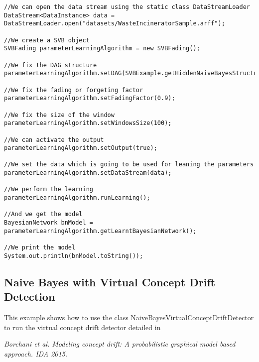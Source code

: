 \begin{lstlisting}
//We can open the data stream using the static class DataStreamLoader
DataStream<DataInstance> data = DataStreamLoader.open("datasets/WasteIncineratorSample.arff");

//We create a SVB object
SVBFading parameterLearningAlgorithm = new SVBFading();

//We fix the DAG structure
parameterLearningAlgorithm.setDAG(SVBExample.getHiddenNaiveBayesStructure(data));

//We fix the fading or forgeting factor
parameterLearningAlgorithm.setFadingFactor(0.9);

//We fix the size of the window
parameterLearningAlgorithm.setWindowsSize(100);

//We can activate the output
parameterLearningAlgorithm.setOutput(true);

//We set the data which is going to be used for leaning the parameters
parameterLearningAlgorithm.setDataStream(data);

//We perform the learning
parameterLearningAlgorithm.runLearning();

//And we get the model
BayesianNetwork bnModel = parameterLearningAlgorithm.getLearntBayesianNetwork();

//We print the model
System.out.println(bnModel.toString());
\end{lstlisting}


\subsection{Naive Bayes with Virtual Concept Drift Detection}

This example shows how to use the class NaiveBayesVirtualConceptDriftDetector to run the virtual concept drift detector detailed in

\textit{Borchani et al. Modeling concept drift: A probabilistic graphical model based approach. IDA 2015.}

